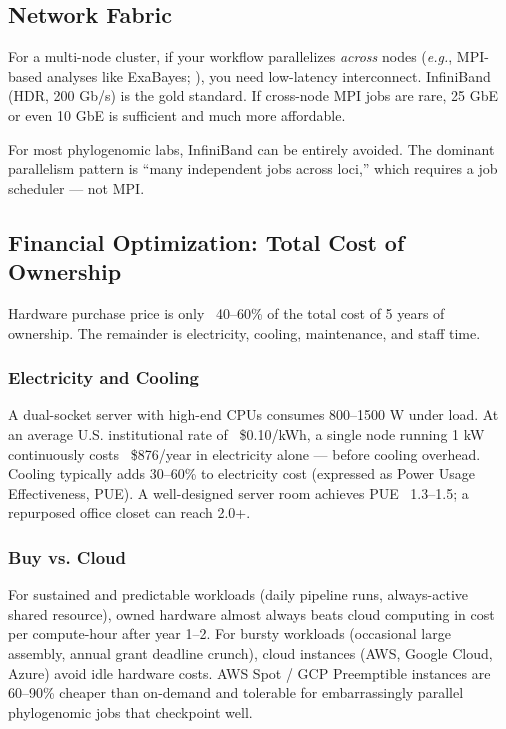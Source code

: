 \subsection{Network Fabric}

For a multi-node cluster, if your workflow parallelizes \textit{across} nodes (\textit{e.g.}, MPI-based analyses like ExaBayes; \textcite{aberer2014}), you need low-latency interconnect. InfiniBand (HDR, 200 Gb/s) is the gold standard. If cross-node MPI jobs are rare, 25 GbE or even 10 GbE is sufficient and much more affordable.

For most phylogenomic labs, InfiniBand can be entirely avoided. The dominant parallelism pattern is ``many independent jobs across loci,'' which requires a job scheduler --- not MPI.

\subsection{Financial Optimization: Total Cost of Ownership}

Hardware purchase price is only ~40--60\% of the total cost of 5 years of ownership. The remainder is electricity, cooling, maintenance, and staff time.

\subsubsection{Electricity and Cooling}

A dual-socket server with high-end CPUs consumes 800--1500 W under load. At an average U.S. institutional rate of ~\$0.10/kWh, a single node running 1 kW continuously costs ~\$876/year in electricity alone --- before cooling overhead. Cooling typically adds 30--60\% to electricity cost (expressed as Power Usage Effectiveness, PUE). A well-designed server room achieves PUE ~1.3--1.5; a repurposed office closet can reach 2.0+.

\subsubsection{Buy vs. Cloud}

For sustained and predictable workloads (daily pipeline runs, always-active shared resource), owned hardware almost always beats cloud computing in cost per compute-hour after year 1--2. For bursty workloads (occasional large assembly, annual grant deadline crunch), cloud instances (AWS, Google Cloud, Azure) avoid idle hardware costs. AWS Spot / GCP Preemptible instances are 60--90\% cheaper than on-demand and tolerable for embarrassingly parallel phylogenomic jobs that checkpoint well.

